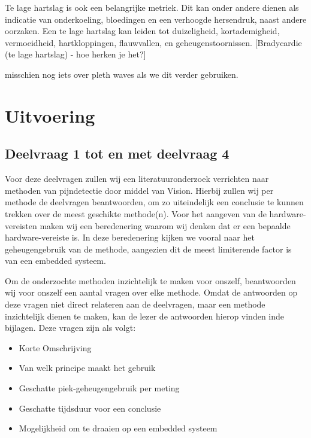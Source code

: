 \documentclass[11pt]{article}
\begin{document}
    Te lage hartslag is ook een belangrijke metriek. 
    Dit kan onder andere dienen als indicatie van onderkoeling, bloedingen en een verhoogde hersendruk, naast andere oorzaken. 
    Een te lage hartslag kan leiden tot duizeligheid, kortademigheid, vermoeidheid, hartkloppingen, flauwvallen, en geheugenstoornissen. 
    [Bradycardie (te lage hartslag) - hoe herken je het?]

    misschien nog iets over pleth waves als we dit verder gebruiken.



    \section{Uitvoering}\label{sec:uitvoering}
    \subsection{Deelvraag 1 tot en met deelvraag 4}\label{subsec:deelvraag-1-tot-en-met-deelvraag-4}
    Voor deze deelvragen zullen wij een literatuuronderzoek
    verrichten naar methoden van pijndetectie door middel van Vision.
    Hierbij zullen wij per methode de deelvragen beantwoorden, om zo uiteindelijk een conclusie te kunnen trekken over
    de meest geschikte methode(n).
    Voor het aangeven van de hardware-vereisten maken wij een beredenering waarom wij denken dat er een bepaalde hardware-vereiste is.
    In deze beredenering kijken we vooral naar het geheugengebruik van de methode,
    aangezien dit de meest limiterende factor is van een embedded systeem.

    Om de onderzochte methoden inzichtelijk te maken voor onszelf, beantwoorden wij voor onszelf een aantal vragen over elke methode.
    Omdat de antwoorden op deze vragen niet direct relateren aan de deelvragen, maar een methode inzichtelijk dienen te maken, kan de lezer de antwoorden hierop vinden inde bijlagen.
    Deze vragen zijn als volgt:
    \begin{itemize}
        \item Korte Omschrijving
        \item Van welk principe maakt het gebruik
        \item Geschatte piek-geheugengebruik per meting
        \item Geschatte tijdsduur voor een conclusie
        \item Mogelijkheid om te draaien op een embedded systeem
    \end{itemize}
\end{document}
